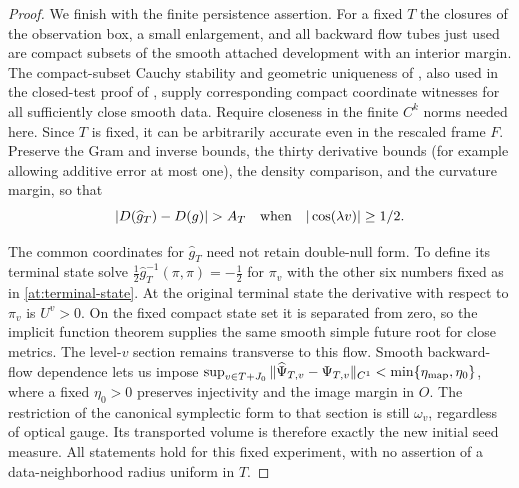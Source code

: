 \begin{proof}
We finish with the finite persistence assertion. For a fixed $T$
the closures of the observation box, a small enlargement, and
all backward flow tubes just used are compact subsets of the
smooth attached development with an interior margin. The
compact-subset Cauchy stability and geometric uniqueness of
\cite[]{KerrCTwo}, also used in the closed-test proof
of \cite[, proof]{KerrCOne}, supply corresponding compact
coordinate witnesses for all sufficiently close smooth data.
Require closeness in the finite $C^k$ norms needed here. Since
$T$ is fixed, it can be arbitrarily accurate even in the
rescaled frame $F$. Preserve the Gram and inverse bounds,
the thirty derivative bounds (for example allowing additive
error at most one), the density comparison, and the curvature
margin, so that
\begin{equation}\label{at:persisted-signal}
 |D(\widehat g_T)-D(g)|>\amp
        \quad\hbox{when}\quad |\cos(\lambda v)|\ge1/2.
\end{equation}

The common coordinates for $\widehat g_T$ need not retain
double-null form. To define its terminal state solve
$\tfrac12\widehat g_T^{-1}(\pi,\pi)=-\tfrac12$ for
$\pi_v$ with the other six numbers fixed as in
\eqref{at:terminal-state}. At the original terminal state the
derivative with respect to $\pi_v$ is $U^v>0$.
On the fixed compact state set it is separated from zero, so
the implicit function theorem supplies the same smooth simple
future root for close metrics. The level-$v$ section remains
transverse to this flow. Smooth backward-flow dependence lets us impose
$\sup_{v\in T+J_0}\|\widehat\Psi_{T,v}-\Psi_{T,v}\|_{C^1}
<\min\{\eta_{\rm map},\eta_0\}$, where a fixed $\eta_0>0$ preserves
injectivity and the image margin in $O$.
The restriction of the canonical symplectic form to that section
is still $\omega_v$, regardless of optical gauge. Its transported
volume is therefore exactly the new initial seed measure.
All statements hold for this fixed experiment, with no assertion
of a data-neighborhood radius uniform in $T$.
\end{proof}
